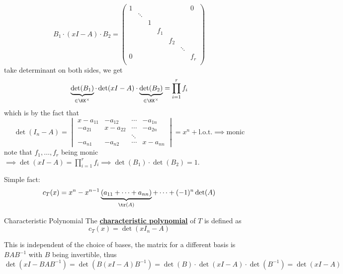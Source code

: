\begin{conclusion}
\begin{enumerate}
		      \[
			      B_1 \cdot (xI - A ) \cdot B_2 =
			      \begin{pmatrix}
				      1 &        &   &     &     &        & 0   \\
				        & \ddots &   &     &     &        &     \\
				        &        & 1 &     &     &        &     \\
				        &        &   & f_1 &     &        &     \\
				        &        &   &     & f_2 &        &     \\
				        &        &   &     &     & \ddots &     \\
				      0 &        &   &     &     &        & f_r \\
			      \end{pmatrix}
		      \]
		      take determinant on both sides, we get
		      \[
			      \underbrace{\det(B_1)}_{\in \KK^{\times}} \cdot \det(xI - A) \cdot \underbrace{\det(B_2)}_{\in \KK^\times}
			      = \prod_{i=1}^r f_i
		      \]
		      which is by the fact that
		      \[
			      \det (I_n - A) =
			      \begin{vmatrix}
				      x-a_{11} & - a_{12} & \cdots & -a_{1n}  \\
				      -a_{21}  & x-a_{22} & \cdots & -a_{2n}  \\
				               &          & \ddots &          \\
				      -a_{n 1} & -a_{n 2} & \cdots & x-a_{nn}
			      \end{vmatrix} = x^n + \text{l.o.t.} \implies \text{monic}
		      \]
		      note that \( f_1,\ldots, f_r \) being monic \( \implies \det(xI - A) = \prod_{i=1}^r f_i \implies
		      \det(B_1) \cdot \det(B_2) = 1\).

		      \begin{remark}
			      Simple fact:
			      \[
				      c_T (x) = x^n - x^{n-1}\underbrace{(a_{11} + \cdots + a_{nn})}_{\tr(A)} + \cdots +
				      (-1)^n \det(A)
			      \]
		      \end{remark}
	\end{enumerate}
\end{conclusion}

\begin{definition}{Characteristic Polynomial}
	The \underline{\textbf{characteristic polynomial}} of \( T \) is defined as
	\[
		c_T(x) = \det(xI_n - A)
	\]
\end{definition}

\begin{note}
	This is independent of the choice of bases, the matrix for a different basis is \( BAB^{-1} \)
	with \( B \) being invertible, thus
	\[
		\det(xI - BAB^{-1}) = \det(B(xI - A)B^{-1}) = \det(B) \cdot \det(xI - A) \cdot \det(B^{-1}) =
		\det(xI - A)
	\]
\end{note}

